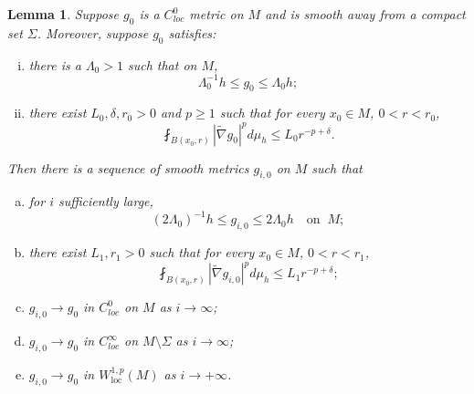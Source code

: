 \documentclass[12pt]{amsart}
\theoremstyle{plain}
\theoremstyle{plain}
\newtheorem{lemma}[subsection]{Lemma}
\theoremstyle{definition}
\theoremstyle{remark}
\numberwithin{equation}{subsection}
\newcommand{\hdel}{\tilde{\nabla}}
\begin{document}
\begin{lemma}\label{lem:mollification-scheme}
    Suppose $g_0$ is a $C^0_{loc}$ metric on $M$ and is smooth away from a compact set $\Sigma$. Moreover, suppose $g_0$ satisfies:
    \begin{enumerate}[(i)]
        \item there is a $\Lambda_0 > 1$ such that on $M$,
        \begin{equation*}
            \Lambda_0^{-1}h \leq g_0 \leq \Lambda_0 h;
        \end{equation*}
        \item there exist $L_0,\delta,r_0 > 0$ and $p\geq 1$ such that for every $x_0 \in M$, $0 < r < r_0$,
        \begin{equation*}
            \fint_{B(x_0,r)} |\hdel g_0|^p d\mu_h \leq L_0 r^{-p+\delta}.
        \end{equation*}
    \end{enumerate}
    Then there is a sequence of smooth metrics $g_{i,0}$ on $M$ such that %
    \begin{enumerate}[(a)]
        \item for $i$ sufficiently large,
        \begin{equation*}
            (2\Lambda_0)^{-1}h \leq g_{i,0} \leq 2\Lambda_0 h\quad\text{on}\;\;M;
        \end{equation*}
        \item  there exist $L_1,r_1 > 0$  such that for every $x_0 \in M$, $0 < r < r_1$,
        \begin{equation*}
            \fint_{B(x_0,r)} |\hdel g_{i,0}|^p d\mu_h \leq L_1 r^{-p+\delta};
        \end{equation*}
        \item $g_{i,0} \to g_0$ in $C^0_{loc}$ on $M$ as $i \to \infty$;
        \item $g_{i,0} \to g_0$ in $C^\infty_{loc}$ on $M\setminus\Sigma$ as $i \to \infty$;
        \item $g_{i,0} \to g_0$ in $W^{1,p}_\text{loc}(M)$ as $i\to+\infty$.
    \end{enumerate}
\end{lemma}
\end{document}
